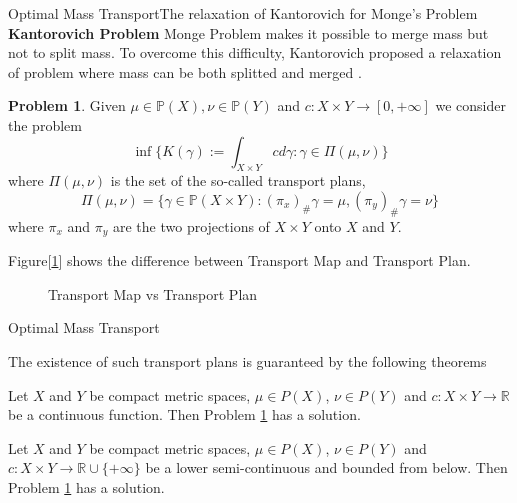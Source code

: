 \documentclass{beamer}
\theoremstyle{definition}
\newtheorem{mypro}{Problem}
\begin{document}
\begin{frame}{Optimal Mass Transport}{The relaxation of Kantorovich for Monge's Problem}
\textbf{Kantorovich Problem} Monge Problem makes it possible to merge mass but not to split mass. To overcome this difficulty, Kantorovich\cite{kantorovich1942transfer} proposed a relaxation of problem where mass can be both splitted and merged .
\begin{mypro}
Given $\mu \in \mathbb{P}(X), \nu \in \mathbb{P}(Y)$ and $c:X\times Y \rightarrow [0,+\infty]$ we consider the problem $$\inf \{K(\gamma):=\int_{X\times Y}cd\gamma: \gamma \in \Pi(\mu, \nu) \}$$
where $\Pi(\mu ,\nu)$ is the set of the so-called transport plans, $$\Pi(\mu,\nu) = \{\gamma \in \mathbb{P}(X\times Y):(\pi_x)_{\#}\gamma = \mu, (\pi_y)_{\#}\gamma = \nu\}$$
where $\pi_x$ and $\pi_y$ are the two projections of $X\times Y$ onto $X$ and $Y$.
\label{Pro:Kanto}
\end{mypro}
\end{frame}


\begin{frame}
Figure[\ref{fig:mapplan}] shows the difference between Transport Map and Transport Plan.
\begin{figure}
\centering
{}
\caption{Transport Map vs Transport Plan}
\label{fig:mapplan}
\end{figure}

\end{frame}


\begin{frame}{Optimal Mass Transport}

The existence of such transport plans is guaranteed by the following theorems \cite{santambrogio2015optimal}
\begin{theorem}
Let $X$ and $Y$ be compact metric spaces, $\mu\in P(X)$, $\nu\in P(Y)$ and $c:X\times Y\rightarrow\mathbb{R}$ be a continuous function. Then Problem \ref{Pro:Kanto} has a solution.
\label{1.4}
\end{theorem}
\begin{theorem}
Let $X$ and $Y$ be compact metric spaces, $\mu\in P(X)$, $\nu\in P(Y)$ and $c:X\times Y\rightarrow\mathbb{R}\cup \{+\infty\}$ be a lower semi-continuous and bounded from below. Then Problem \ref{Pro:Kanto} has a solution.
\end{theorem}
\end{frame}
\end{document}
